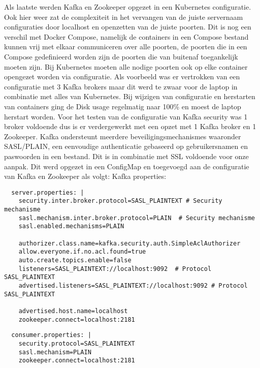 Als laatste werden Kafka en Zookeeper opgezet in een Kubernetes configuratie. Ook hier weer zat de complexiteit in het vervangen van de juiste servernaam configuraties door localhost en openzetten van de juiste poorten.
Dit is nog een verschil met Docker Compose, namelijk de containers in een Compose bestand kunnen vrij met elkaar communiceren over alle poorten, de poorten die in een Compose gedefinieerd worden zijn de poorten die van buitenaf toegankelijk moeten zijn. Bij Kubernetes moeten alle nodige poorten ook op elke container opengezet worden via configuratie.
\newline
\newline
Als voorbeeld was er vertrokken van een configuratie met 3 Kafka brokers maar dit werd te zwaar voor de laptop in combinatie met alles van Kubernetes. Bij wijzigen van configuratie en herstarten van containers ging de Disk usage regelmatig naar 100\% en moest de laptop herstart worden. Voor het testen van de configuratie van Kafka security was 1 broker voldoende dus is er verdergewerkt met een opzet met 1 Kafka broker en 1 Zookeeper. 
\newline
Kafka ondersteunt meerdere beveiligingsmechanismes waaronder SASL/PLAIN, een eenvoudige authenticatie gebaseerd op gebruikersnamen en paswoorden in een bestand. Dit is in combinatie met SSL voldoende voor onze aanpak.
\newline
Dit werd opgezet in een ConfigMap en toegevoegd aan de configuratie van Kafka en Zookeeper als volgt:
\newline
\newline
Kafka properties:
\begin{lstlisting}
  server.properties: |
    security.inter.broker.protocol=SASL_PLAINTEXT # Security mechanisme
    sasl.mechanism.inter.broker.protocol=PLAIN  # Security mechanisme
    sasl.enabled.mechanisms=PLAIN

    authorizer.class.name=kafka.security.auth.SimpleAclAuthorizer
    allow.everyone.if.no.acl.found=true
    auto.create.topics.enable=false
    listeners=SASL_PLAINTEXT://localhost:9092  # Protocol SASL_PLAINTEXT
    advertised.listeners=SASL_PLAINTEXT://localhost:9092 # Protocol SASL_PLAINTEXT

    advertised.host.name=localhost
    zookeeper.connect=localhost:2181
\end{lstlisting}

\begin{lstlisting}
  consumer.properties: |
    security.protocol=SASL_PLAINTEXT
    sasl.mechanism=PLAIN
    zookeeper.connect=localhost:2181
\end{lstlisting}

